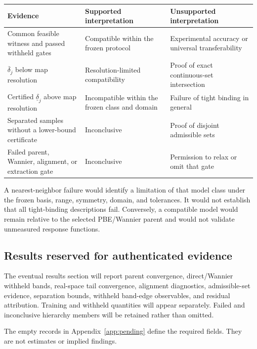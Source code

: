 \documentclass[11pt]{article}
\newenvironment{prospective}{\color{prospectivered}}{}
\begin{document}
\begin{prospective}
\begin{center}\small
\begin{tabularx}{\textwidth}{XXX}
\toprule
\textbf{Evidence} & \textbf{Supported interpretation} & \textbf{Unsupported interpretation} \\
\midrule
Common feasible witness and passed withheld gates & Compatible within the frozen protocol & Experimental accuracy or universal transferability \\
$\overline\delta_j$ below map resolution & Resolution-limited compatibility & Proof of exact continuous-set intersection \\
Certified $\underline\delta_j$ above map resolution & Incompatible within the frozen class and domain & Failure of tight binding in general \\
Separated samples without a lower-bound certificate & Inconclusive & Proof of disjoint admissible sets \\
Failed parent, Wannier, alignment, or extraction gate & Inconclusive & Permission to relax or omit that gate \\
\bottomrule
\end{tabularx}
\end{center}
A nearest-neighbor failure would identify a limitation of that model class under the frozen basis, range, symmetry, domain, and tolerances. It would not establish that all tight-binding descriptions fail. Conversely, a compatible model would remain relative to the selected PBE/Wannier parent and would not validate unmeasured response functions.

\subsection{Results reserved for authenticated evidence}
The eventual results section will report parent convergence, direct/Wannier withheld bands, real-space tail convergence, alignment diagnostics, admissible-set evidence, separation bounds, withheld band-edge observables, and residual attribution. Training and withheld quantities will appear separately. Failed and inconclusive hierarchy members will be retained rather than omitted.

The empty records in Appendix~\ref{app:pending} define the required fields. They are not
estimates or implied findings.

\end{prospective}
\end{document}
